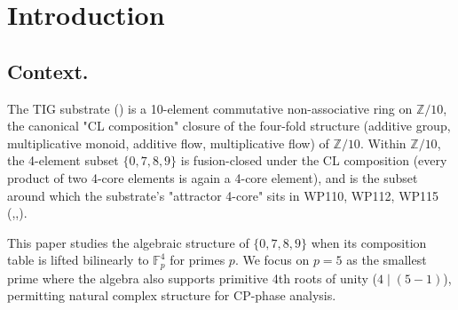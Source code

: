 \documentclass[11pt]{amsart}
\theoremstyle{plain}
\theoremstyle{definition}
\theoremstyle{remark}
\newcommand{\Z}{\mathbb{Z}}
\newcommand{\F}{\mathbb{F}}
\newcommand{\fourcore}{\{0,7,8,9\}}
\begin{document}
\maketitle

\tableofcontents

\section{Introduction}

\subsection{Context.}
The TIG substrate (\cite{TIGsynthesis2026}) is a 10-element commutative
non-associative ring on $\Z/10$, the canonical "CL composition" closure of
the four-fold structure (additive group, multiplicative monoid, additive
flow, multiplicative flow) of $\Z/10$. Within $\Z/10$, the 4-element subset
$\fourcore$ is fusion-closed under the CL composition (every product of
two 4-core elements is again a 4-core element), and is the subset around
which the substrate's "attractor 4-core" sits in WP110, WP112, WP115
(\cite{WP110},\cite{WP112},\cite{WP115}).

This paper studies the algebraic structure of $\fourcore$ when its
composition table is lifted bilinearly to $\F_p^4$ for primes $p$. We
focus on $p=5$ as the smallest prime where the algebra also supports
primitive 4th roots of unity ($4 \mid (5-1)$), permitting natural complex
structure for CP-phase analysis.
\end{document}
